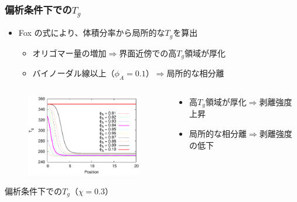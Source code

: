 \documentclass[unicode,12pt]{beamer}%
\begin{document}
\begin{frame}\frametitle{偏析条件下での$T_g$}

\begin{itemize}
	\item Fox の式により、体積分率から局所的な$T_g$を算出
	\begin{itemize}
	\item オリゴマー量の増加$\Rightarrow$界面近傍での高$T_g$領域が厚化
	\item バイノーダル線以上（$\phi_A = 0.1$）$\Rightarrow$局所的な相分離
	\end{itemize}
\end{itemize}

\begin{columns}
	\begin{column}{6.0cm}
		\vspace{-1\baselineskip}
		\begin{figure}[htbp]
			\begin{center}
				\includegraphics[width=60mm]{A6_B600_Chi_03_chiS_0.0_Tg.eps}
			\end{center}
		\end{figure}
		\begin{center}
			\vspace{-0.5\baselineskip}
			{\footnotesize 偏析条件下での$T_g$（$\chi = 0.3$）}
		\end{center}
	\end{column}
	\begin{column}{6.0cm}
		\begin{block}{}
		\vspace{-0.5\baselineskip}
		{\footnotesize 
		\begin{itemize}
		\item 高$T_g$領域が厚化$\Rightarrow$剥離強度上昇
		\item 局所的な相分離$\Rightarrow$剥離強度の低下
			\end{itemize}
		}
		\end{block}
		\vspace{-1\baselineskip}
		\begin{figure}[htbp]

\end{figure}
\end{column}
\end{columns}
\end{frame}
\end{document}
